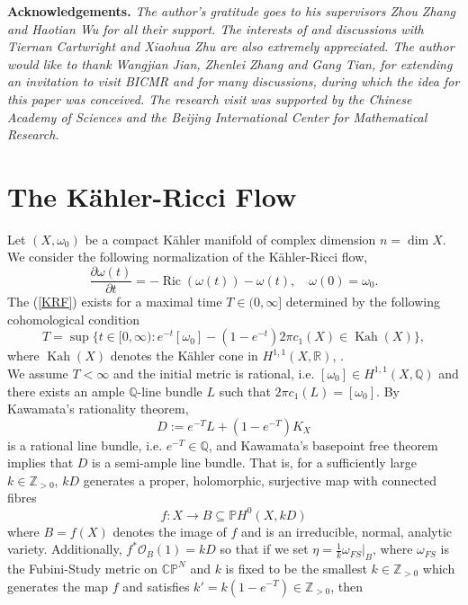\documentclass[12pt]{article}
\numberwithin{equation}{section}
\newcommand{\R}{\mathbb{R}}
\newcommand{\Z}{\mathbb{Z}}
\newcommand{\Q}{\mathbb{Q}}
\renewcommand{\P}{\mathbb{P}}
\newcommand{\CP}{\mathbb{CP}}
\newcommand{\OO}{\mathcal{O}}
\renewcommand{\d}{\partial}
\DeclareMathOperator{\Ric}{Ric}
\DeclareMathOperator{\Kah}{Kah}
\begin{document}
\noindent \textbf{Acknowledgements.} \textit{The author's gratitude goes to his supervisors Zhou Zhang and Haotian Wu for all their support. The interests of and discussions with Tiernan Cartwright and Xiaohua Zhu are also extremely appreciated. The author would like to thank Wangjian Jian, Zhenlei Zhang and Gang Tian, for extending an invitation to visit BICMR and for many discussions, during which the idea for this paper was conceived. The research visit was supported by the Chinese Academy of Sciences and the Beijing International Center for Mathematical Research.}

\section{The K\"ahler-Ricci Flow}

Let $(X,\omega_0)$ be a compact K\"ahler manifold of complex dimension $n = \dim X$. We consider the following normalization of the K\"ahler-Ricci flow,
\begin{equation}\label{KRF}\tag{KRF}
    \frac{\d \omega(t)}{\d t} = -\Ric(\omega(t)) - \omega(t), \quad \omega(0) = \omega_0.
\end{equation}
The (\ref{KRF}) exists for a maximal time $T \in (0,\infty]$ determined by the following cohomological condition
\begin{equation*}
    T = \sup \{ t \in [0,\infty): e^{-t} [\omega_0] - (1-e^{-t}) 2\pi c_1(X) \in \Kah(X)\},
\end{equation*}
where $\Kah(X)$ denotes the K\"ahler cone in $H^{1,1}(X,\R)$, \cite{TZ06}.\\
We assume $T < \infty$ and the initial metric is rational, i.e. $[\omega_0] \in H^{1,1}(X,\Q)$ and there exists an ample $\Q$-line bundle $L$ such that $2\pi c_1(L) = [\omega_0]$. By Kawamata's rationality theorem, 
\begin{equation*}
    D := e^{-T} L + (1-e^{-T}) K_X
\end{equation*}
is a rational line bundle, i.e. $e^{-T} \in \Q$, and Kawamata's basepoint free theorem implies that $D$ is a semi-ample line bundle. That is, for a sufficiently large $k \in \Z_{>0}$, $kD$ generates a proper, holomorphic, surjective map with connected fibres
\begin{equation*}
    f: X \to B \subseteq \P H^0(X,kD)
\end{equation*}
where $B = f(X)$ denotes the image of $f$ and is an irreducible, normal, analytic variety. Additionally, $f^* \OO_B(1) = kD$ so that if we set $\eta = \frac{1}{k}\omega_{FS}|_{B}$, where $\omega_{FS}$ is the Fubini-Study metric on $\CP^N$ and $k$ is fixed to be the smallest $k \in \Z_{>0}$ which generates the map $f$ and satisfies $k' = k(1-e^{-T}) \in \Z_{>0}$, then
\end{document}

